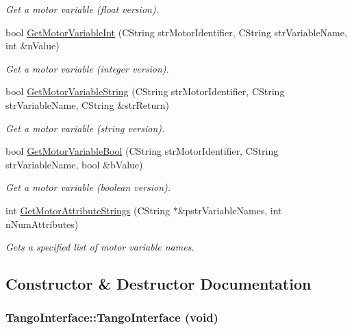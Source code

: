 \begin{CompactItemize}
\begin{CompactList}\small\item\em Get a motor variable (float version). \item\end{CompactList}\item 
bool \hyperlink{classTangoInterface_22a22602be1fef00ab7376be40b58ff4}{GetMotorVariableInt} (CString strMotorIdentifier, CString strVariableName, int \&nValue)
\begin{CompactList}\small\item\em Get a motor variable (integer version). \item\end{CompactList}\item 
bool \hyperlink{classTangoInterface_2d5610cce92ea977ad74202219b1a0af}{GetMotorVariableString} (CString strMotorIdentifier, CString strVariableName, CString \&strReturn)
\begin{CompactList}\small\item\em Get a motor variable (string version). \item\end{CompactList}\item 
bool \hyperlink{classTangoInterface_8b0eb830867b7d62dc4350b49b430705}{GetMotorVariableBool} (CString strMotorIdentifier, CString strVariableName, bool \&bValue)
\begin{CompactList}\small\item\em Get a motor variable (boolean version). \item\end{CompactList}\item 
int \hyperlink{classTangoInterface_78ab845a344c3d140cbeef3da653ca29}{GetMotorAttributeStrings} (CString $\ast$\&pstrVariableNames, int nNumAttributes)
\begin{CompactList}\small\item\em Gets a specified list of motor variable names. \item\end{CompactList}\end{CompactItemize}


\subsection{Constructor \& Destructor Documentation}
\hypertarget{classTangoInterface_075eeb694387d0a1621cfdcfe06d222f}{
\subsubsection[TangoInterface]{\setlength{\rightskip}{0pt plus 5cm}TangoInterface::TangoInterface (void)}}
\label{classTangoInterface_075eeb694387d0a1621cfdcfe06d222f}



